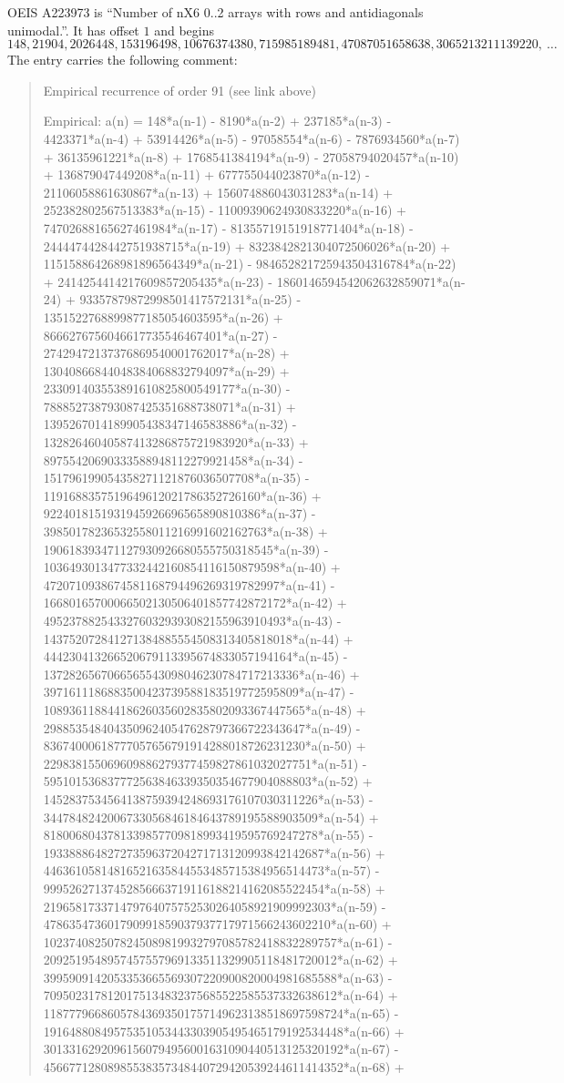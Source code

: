 \documentclass[11pt,a4paper]{article}
\theoremstyle{plain}
\theoremstyle{definition}
\begin{document}
OEIS A223973 is ``Number of nX6 0..2 arrays with rows and antidiagonals unimodal.''. It has offset $1$ and begins
\[
148, 21904, 2026448, 153196498, 10676374380, 715985189481, 47087051658638, 3065213211139220,\ \dots
\]
The entry carries the following comment:
\begin{quote}\small
Empirical recurrence of order 91 (see link above)

Empirical: a(n) = 148*a(n-1) - 8190*a(n-2) + 237185*a(n-3) - 4423371*a(n-4) + 53914426*a(n-5) - 97058554*a(n-6) - 7876934560*a(n-7) + 36135961221*a(n-8) + 1768541384194*a(n-9) - 27058794020457*a(n-10) + 136879047449208*a(n-11) + 677755044023870*a(n-12) - 21106058861630867*a(n-13) + 156074886043031283*a(n-14) + 252382802567513383*a(n-15) - 11009390624930833220*a(n-16) + 74702688165627461984*a(n-17) - 81355719151918771404*a(n-18) - 2444474428442751938715*a(n-19) + 8323842821304072506026*a(n-20) + 115158864268981896564349*a(n-21) - 984652821725943504316784*a(n-22) + 2414254414217609857205435*a(n-23) - 1860146594542062632859071*a(n-24) + 93357879872998501417572131*a(n-25) - 1351522768899877185054603595*a(n-26) + 8666276756046617735546467401*a(n-27) - 27429472137376869540001762017*a(n-28) + 13040866844048384068832794097*a(n-29) + 233091403553891610825800549177*a(n-30) - 788852738793087425351688738071*a(n-31) + 1395267014189905438347146583886*a(n-32) - 13282646040587413286875721983920*a(n-33) + 89755420690333588948112279921458*a(n-34) - 151796199054358271121876036507708*a(n-35) - 1191688357519649612021786352726160*a(n-36) + 9224018151931945926696565890810386*a(n-37) - 39850178236532558011216991602162763*a(n-38) + 190618393471127930926680555750318545*a(n-39) - 1036493013477332442160854116150879598*a(n-40) + 4720710938674581168794496269319782997*a(n-41) - 16680165700066502130506401857742872172*a(n-42) + 49523788254332760329393082155963910493*a(n-43) - 143752072841271384885554508313405818018*a(n-44) + 444230413266520679113395674833057194164*a(n-45) - 1372826567066565543098046230784717213336*a(n-46) + 3971611186883500423739588183519772595809*a(n-47) - 10893611884418626035602835802093367447565*a(n-48) + 29885354840435096240547628797366722343647*a(n-49) - 83674000618777057656791914288018726231230*a(n-50) + 229838155069609886279377459827861032027751*a(n-51) - 595101536837772563846339350354677904088803*a(n-52) + 1452837534564138759394248693176107030311226*a(n-53) - 3447848242006733056846184643789195588903509*a(n-54) + 8180068043781339857709818993419595769247278*a(n-55) - 19338886482727359637204271713120993842142687*a(n-56) + 44636105814816521635844553485715384956514473*a(n-57) - 99952627137452856663719116188214162085522454*a(n-58) + 219658173371479764075752530264058921909992303*a(n-59) - 478635473601790991859037937717971566243602210*a(n-60) + 1023740825078245089819932797085782418832289757*a(n-61) - 2092519548957457557969133511329905118481720012*a(n-62) + 3995909142053353665569307220900820004981685588*a(n-63) - 7095023178120175134832375685522585537332638612*a(n-64) + 11877796686057843693501757149623138518697598724*a(n-65) - 19164880849575351053443303905495465179192534448*a(n-66) + 30133162920961560794956001631090440513125320192*a(n-67) - 45667712808985538357348440729420539244611414352*a(n-68) + 
\end{quote}
\end{document}

